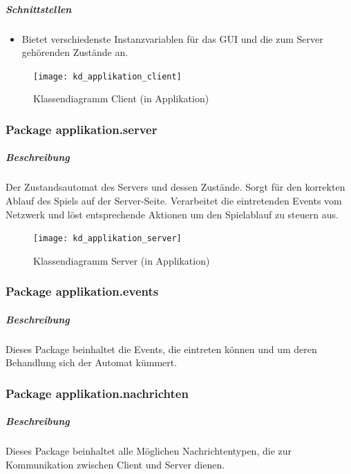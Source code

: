 \documentclass[12pt,halfparskip]{scrartcl}
\begin{document}
\subparagraph{Schnittstellen}
\label{ssub:schnittstellen}
\begin{itemize}
	\item Bietet verschiedenste Instanzvariablen für das GUI und die zum Server gehörenden Zustände an.
\end{itemize}

\begin{figure}[h]
	\centering
	\texttt{[image: kd\_applikation\_client]}
	\caption{Klassendiagramm Client (in Applikation)}
	\label{fig:kd_applikation_client}
\end{figure}

\clearpage
\subsubsection{Package applikation.server}
\label{ssub:package_applikation_server} %
\subparagraph{Beschreibung}
\label{ssub:beschreibung}
Der Zustandsautomat des Servers und dessen Zustände. Sorgt für den korrekten Ablauf des Spiels auf der Server-Seite. Verarbeitet die eintretenden Events vom Netzwerk und löst entsprechende Aktionen um den Spielablauf zu steuern aus.


\begin{figure}[h]
	\centering
	\texttt{[image: kd\_applikation\_server]}
	\caption{Klassendiagramm Server (in Applikation)}
	\label{fig:kd_applikation_server}
\end{figure}

\subsubsection{Package applikation.events}
\label{ssub:package_applikation_events} %
\subparagraph{Beschreibung}
\label{ssub:beschreibung}
Dieses Package beinhaltet die Events, die eintreten können und um deren Behandlung sich der Automat kümmert.

\subsubsection{Package applikation.nachrichten}
\label{ssub:package_applikation_nachrichten} %
\subparagraph{Beschreibung}
\label{ssub:beschreibung}
Dieses Package beinhaltet alle Möglichen Nachrichtentypen, die zur Kommunikation zwischen Client und Server dienen.
\end{document}
